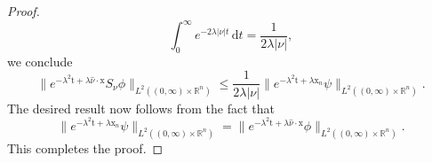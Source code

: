 \documentclass[10pt,a4paper]{amsart}
\newcommand{\R}{\mathbb{R}}
\newcommand{\dd}{\mathrm{d}}
\newcommand{\tm}{\mathrm{t}}
\newcommand{\x}{\mathrm{x}}
\begin{document}
\begin{proof}
\[ \int_0^\infty e^{-2\lambda |\nu| t} \, \dd t = \frac{1}{2\lambda  |\nu|}, \]
we conclude
\begin{equation*}
    \| e^{-\lambda^2 \tm + \lambda \hat{\nu} \cdot \x} S_\nu \phi \|_{L^2((0, \infty) \times \R^n)}  \leq \frac{1}{2 \lambda |\nu|} \| e^{-\lambda^2 \tm + \lambda \x_n} \psi \|_{L^2((0, \infty) \times \R^n)}.
\end{equation*}
The desired result now follows from the fact that 
\begin{equation*}
   \| e^{-\lambda^2 \tm + \lambda \x_n} \psi \|_{L^2((0, \infty) \times \R^n)} =  \| e^{-\lambda^2 \tm + \lambda \hat{\nu} \cdot \x}  \phi \|_{L^2((0, \infty) \times \R^n)}.
\end{equation*}
This completes the proof.
\end{proof}
\end{document}
